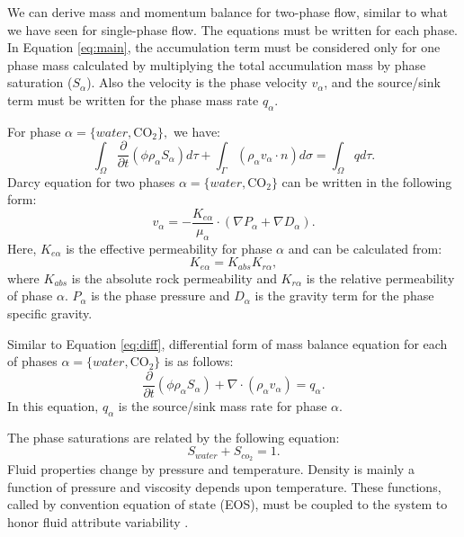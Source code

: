 We can derive mass and momentum balance for two-phase flow, similar to what we
have seen for single-phase flow. The equations must be written for each phase.
In
Equation \ref{eq:main}, the accumulation term must be considered only for one
phase mass calculated by multiplying the total accumulation mass by phase
saturation ($ S_{\alpha}$). Also the velocity is the phase velocity
$v_{\alpha}$, and the source/sink term must be written for the phase mass rate
$q_{\alpha}$.

For phase $\alpha=\{water, \mbox{CO}_2\},$ we have:
\begin{equation}
  \int_{\Omega}\frac{\partial}{\partial t}(\phi\rho_{\alpha}
S_{\alpha})d\tau+\int_{\Gamma}(\rho_{\alpha} v_{\alpha} \cdot
n)d\sigma=\int_{\Omega}qd\tau.
  \label{eq:2phs}
\end{equation} Darcy equation for two phases $\alpha=\{water, \mbox{CO}_2\}$
can be written in the following form: 
\begin{equation}
  v_{\alpha}=-\frac{K_{e\alpha}}{\mu_{\alpha}}\cdot
(\nabla{P_{\alpha}}+\nabla{D_{\alpha}}).
  \label{eq:D2phs}
\end{equation} Here, $K_{e\alpha}$ is the effective permeability for phase
$\alpha$ and can be calculated from:
\begin{equation}
 K_{e\alpha}=K_{abs}K_{r\alpha},
 \label{eq:Ke}
\end{equation} where $K_{abs}$ is the absolute rock permeability and
$K_{r\alpha}$ is the relative permeability of phase $\alpha$. $P_{\alpha}$ is
the phase pressure and $D_{\alpha}$ is the gravity term for the phase specific
gravity.



Similar to Equation \ref{eq:diff}, differential form of mass balance equation
for each of phases $\alpha=\{water,\mbox{CO}_2\}$ is as follows:
\begin{equation}
 \frac{\partial}{\partial t}(\phi\rho_{\alpha}S_{\alpha})+\nabla \cdot
(\rho_{\alpha} v_{\alpha})=q_{\alpha}.
 \label{eq:dif2p}
\end{equation}
 In this equation, $q_{\alpha}$ is the source/sink mass rate for phase $\alpha$.

 The phase saturations are related by the following equation:
\begin{equation}
  S_{water}+S_{co_2} = 1.
   \label{eq:sat}
\end{equation} Fluid properties change by pressure and temperature. Density is
mainly a function of pressure and viscosity depends upon temperature. These
functions, called by convention equation of state (EOS), must be coupled
to the system to honor fluid attribute variability
\cite{greenwood1969compressibility,duan2006equation}. 
  
